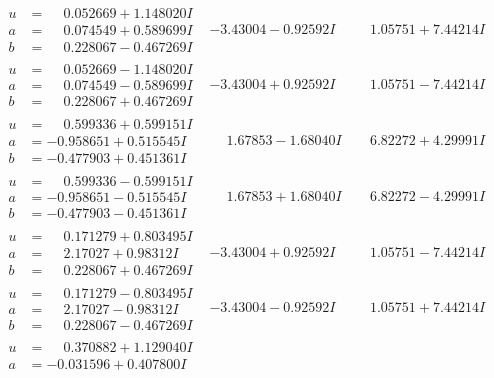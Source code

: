\documentclass[1p]{elsarticle_modified}
\theoremstyle{definition}
\begin{document}
$$\begin{array}{c|c|c}
\begin{aligned}
u &= \phantom{-}0.052669 + 1.148020 I \\
a &= \phantom{-}0.074549 + 0.589699 I \\
b &= \phantom{-}0.228067 - 0.467269 I\end{aligned}
 & -3.43004 - 0.92592 I & \phantom{-}1.05751 + 7.44214 I \\ \hline\begin{aligned}
u &= \phantom{-}0.052669 - 1.148020 I \\
a &= \phantom{-}0.074549 - 0.589699 I \\
b &= \phantom{-}0.228067 + 0.467269 I\end{aligned}
 & -3.43004 + 0.92592 I & \phantom{-}1.05751 - 7.44214 I \\ \hline\begin{aligned}
u &= \phantom{-}0.599336 + 0.599151 I \\
a &= -0.958651 + 0.515545 I \\
b &= -0.477903 + 0.451361 I\end{aligned}
 & \phantom{-}1.67853 - 1.68040 I & \phantom{-}6.82272 + 4.29991 I \\ \hline\begin{aligned}
u &= \phantom{-}0.599336 - 0.599151 I \\
a &= -0.958651 - 0.515545 I \\
b &= -0.477903 - 0.451361 I\end{aligned}
 & \phantom{-}1.67853 + 1.68040 I & \phantom{-}6.82272 - 4.29991 I \\ \hline\begin{aligned}
u &= \phantom{-}0.171279 + 0.803495 I \\
a &= \phantom{-}2.17027 + 0.98312 I \\
b &= \phantom{-}0.228067 + 0.467269 I\end{aligned}
 & -3.43004 + 0.92592 I & \phantom{-}1.05751 - 7.44214 I \\ \hline\begin{aligned}
u &= \phantom{-}0.171279 - 0.803495 I \\
a &= \phantom{-}2.17027 - 0.98312 I \\
b &= \phantom{-}0.228067 - 0.467269 I\end{aligned}
 & -3.43004 - 0.92592 I & \phantom{-}1.05751 + 7.44214 I \\ \hline\begin{aligned}
u &= \phantom{-}0.370882 + 1.129040 I \\
a &= -0.031596 + 0.407800 I \\

\end{aligned}
\end{array}$$
\end{document}
